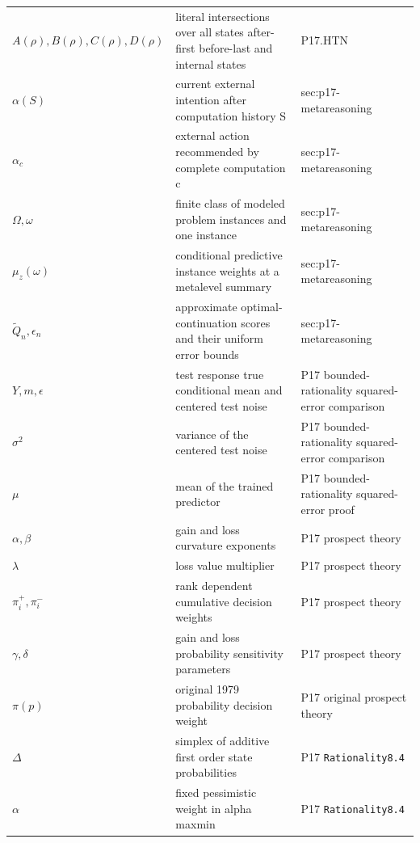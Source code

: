 \begin{longtable}{@{}p{}p{}p{}@{}}
\(A(\rho),\allowbreak B(\rho),\allowbreak C(\rho),\allowbreak D(\rho)\) & literal intersections over all states after-first before-last and internal states & P17.\allowbreak{}HTN \\
\(\alpha(S)\) & current external intention after computation history S & sec:\allowbreak{}p17-\allowbreak{}metareasoning \\
\(\alpha_c\) & external action recommended by complete computation c & sec:\allowbreak{}p17-\allowbreak{}metareasoning \\
\(\Omega,\allowbreak \omega\) & finite class of modeled problem instances and one instance & sec:\allowbreak{}p17-\allowbreak{}metareasoning \\
\(\mu_z(\omega)\) & conditional predictive instance weights at a metalevel summary & sec:\allowbreak{}p17-\allowbreak{}metareasoning \\
\(\widetilde Q_n,\allowbreak \epsilon_n\) & approximate optimal-continuation scores and their uniform error bounds & sec:\allowbreak{}p17-\allowbreak{}metareasoning \\
\(Y,\allowbreak m,\allowbreak \epsilon\) & test response true conditional mean and centered test noise & P17 bounded-\allowbreak{}rationality squared-\allowbreak{}error comparison \\
\(\sigma^2\) & variance of the centered test noise & P17 bounded-\allowbreak{}rationality squared-\allowbreak{}error comparison \\
\(\mu\) & mean of the trained predictor & P17 bounded-\allowbreak{}rationality squared-\allowbreak{}error proof \\
\(\alpha,\allowbreak \beta\) & gain and loss curvature exponents & P17 prospect theory \\
\(\lambda\) & loss value multiplier & P17 prospect theory \\
\(\pi_i^+,\allowbreak \pi_i^-\) & rank dependent cumulative decision weights & P17 prospect theory \\
\(\gamma,\allowbreak \delta\) & gain and loss probability sensitivity parameters & P17 prospect theory \\
\(\pi(p)\) & original 1979 probability decision weight & P17 original prospect theory \\
\(\Delta\) & simplex of additive first order state probabilities & P17 \texttt{Rationality8.\allowbreak{}4} \\
\(\alpha\) & fixed pessimistic weight in alpha maxmin & P17 \texttt{Rationality8.\allowbreak{}4} \\

\end{longtable}

